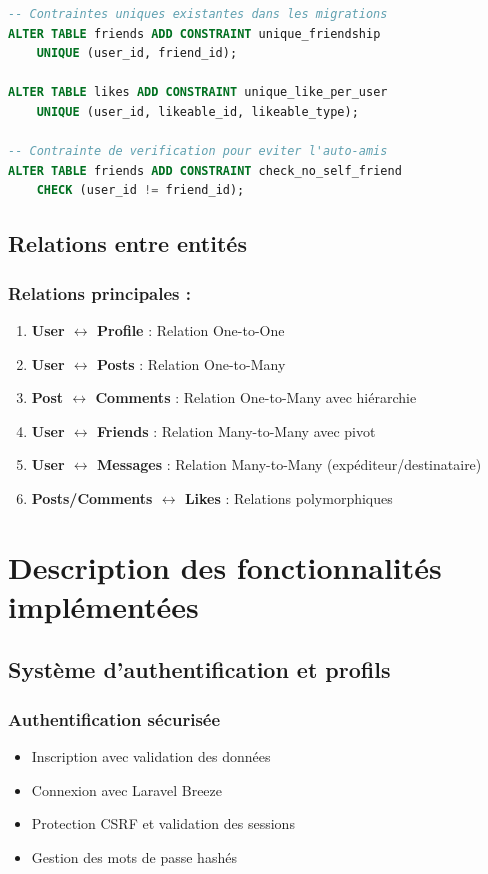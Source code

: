 \documentclass[12pt,a4paper]{article}
\begin{document}
\begin{lstlisting}[language=SQL]
-- Contraintes uniques existantes dans les migrations
ALTER TABLE friends ADD CONSTRAINT unique_friendship 
    UNIQUE (user_id, friend_id);

ALTER TABLE likes ADD CONSTRAINT unique_like_per_user 
    UNIQUE (user_id, likeable_id, likeable_type);

-- Contrainte de verification pour eviter l'auto-amis
ALTER TABLE friends ADD CONSTRAINT check_no_self_friend 
    CHECK (user_id != friend_id);
\end{lstlisting}

\subsection{Relations entre entit\'es}

\subsubsection{Relations principales :}

\begin{enumerate}
    \item \textbf{User $\leftrightarrow$ Profile} : Relation One-to-One
    \item \textbf{User $\leftrightarrow$ Posts} : Relation One-to-Many
    \item \textbf{Post $\leftrightarrow$ Comments} : Relation One-to-Many avec hi\'erarchie
    \item \textbf{User $\leftrightarrow$ Friends} : Relation Many-to-Many avec pivot
    \item \textbf{User $\leftrightarrow$ Messages} : Relation Many-to-Many (exp\'editeur/destinataire)
    \item \textbf{Posts/Comments $\leftrightarrow$ Likes} : Relations polymorphiques
\end{enumerate}

\section{Description des fonctionnalit\'es impl\'ement\'ees}

\subsection{Syst\`eme d'authentification et profils}

\subsubsection{Authentification s\'ecuris\'ee}
\begin{itemize}
    \item Inscription avec validation des donn\'ees
    \item Connexion avec Laravel Breeze
    \item Protection CSRF et validation des sessions
    \item Gestion des mots de passe hash\'es
\end{itemize}
\end{document}
